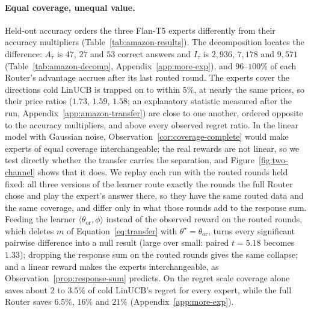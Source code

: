 \documentclass[anon]{alt2027} %
\begin{document}
\paragraph{Equal coverage, unequal value.}
Held-out accuracy orders the three Flan-T5 experts differently from their
accuracy multipliers (Table~\ref{tab:amazon-results}). The decomposition locates the difference:
$A_\tau$ is $47$, $27$ and $53$ correct answers and $I_\tau$ is $2{,}936$,
$7{,}178$ and $9{,}571$ (Table~\ref{tab:amazon-decomp},
Appendix~\ref{app:more-exp}), and $96$--$100\%$ of
each Router's advantage accrues after its last routed round. The experts
cover the directions cold LinUCB is trapped on to within $5\%$, at nearly the
same prices, so their price ratios ($1.73$, $1.59$, $1.58$; an explanatory
statistic measured after the run, Appendix~\ref{app:amazon-transfer}) are
close to one another, ordered opposite to the accuracy multipliers, and above every
observed regret ratio. In the linear model with Gaussian noise,
Observation~\ref{cor:coverage-complete} would make experts of equal coverage
interchangeable; the real rewards are not linear, so we test directly whether
the transfer carries the separation, and Figure~\ref{fig:two-channel} shows
that it does. We replay each run with the routed rounds held fixed: all three
versions of the learner route exactly the rounds the full Router chose and
play the expert's answer there, so they have the same routed data and the same
coverage, and differ only in what those rounds add to the response sum.
Feeding the learner $\langle\theta_{\mathrm{or}},\phi\rangle$ instead of the
observed reward on the routed rounds, which deletes $m$ of
Equation~\eqref{eq:transfer} with $\theta^\star=\theta_{\mathrm{or}}$, turns
every significant pairwise difference into a null result (large over small:
paired $t=5.18$ becomes $1.33$); dropping the response sum on the routed
rounds gives the same collapse; and a linear reward makes the experts
interchangeable, as Observation~\ref{prop:response-sum} predicts. On the
regret scale coverage alone saves about $2$ to $3.5\%$ of cold LinUCB's
regret for every expert, while the full Router saves $6.5\%$, $16\%$ and
$21\%$ (Appendix~\ref{app:more-exp}).
\end{document}
